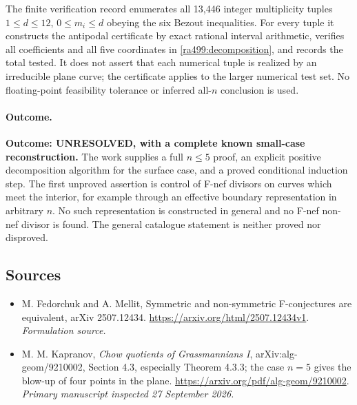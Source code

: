\documentclass[11pt]{article}
\begin{document}
The finite verification record enumerates all 13,446 integer multiplicity tuples
$1\le d\le12$, $0\le m_i\le d$ obeying the six Bezout inequalities.
For every tuple it constructs the antipodal certificate by exact rational
interval arithmetic, verifies all coefficients and all five coordinates
in \eqref{ra499:decomposition}, and records the total tested. It does not
assert that each numerical tuple is realized by an irreducible plane
curve; the certificate applies to the larger numerical test set. No
floating-point feasibility tolerance or inferred all-$n$ conclusion is used.

\paragraph{Outcome.}
\textbf{Outcome: UNRESOLVED, with a complete known small-case reconstruction.}
The work supplies a full $n\le5$ proof, an explicit positive decomposition
algorithm for the surface case, and a proved conditional induction step.
The first unproved assertion is control of F-nef divisors on curves which
meet the interior, for example through an effective boundary representation
in arbitrary $n$. No such representation is constructed in general and no
F-nef non-nef divisor is found. The general catalogue statement is neither
proved nor disproved.

\subsection{Sources}
\begin{itemize}
\item[S1]M. Fedorchuk and A. Mellit, Symmetric and non-symmetric F-conjectures are equivalent, arXiv 2507.12434.
\url{https://arxiv.org/html/2507.12434v1}.
\textit{Formulation source.}
\item[E1]M. M. Kapranov, \emph{Chow quotients of Grassmannians I},
arXiv:alg-geom/9210002, Section 4.3, especially Theorem 4.3.3;
the case $n=5$ gives the blow-up of four points in the plane.
\url{https://arxiv.org/pdf/alg-geom/9210002}.
\textit{Primary manuscript inspected 27 September 2026.}
\end{itemize}
\end{document}
